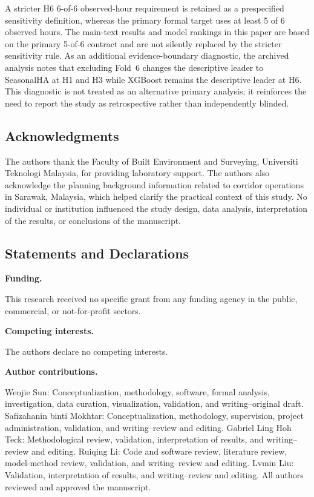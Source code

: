 \documentclass[pdflatex,sn-basic,Numbered]{sn-jnl}
\begin{document}
A stricter H6 6-of-6 observed-hour requirement is retained as a prespecified sensitivity definition, whereas the primary formal target uses at least 5 of 6 observed hours. The main-text results and model rankings in this paper are based on the primary 5-of-6 contract and are not silently replaced by the stricter sensitivity rule. As an additional evidence-boundary diagnostic, the archived analysis notes that excluding Fold~6 changes the descriptive leader to SeasonalHA at H1 and H3 while XGBoost remains the descriptive leader at H6. This diagnostic is not treated as an alternative primary analysis; it reinforces the need to report the study as retrospective rather than independently blinded.


\backmatter

\subsection*{Acknowledgments}

The authors thank the Faculty of Built Environment and Surveying, Universiti Teknologi Malaysia, for providing laboratory support. The authors also acknowledge the planning background information related to corridor operations in Sarawak, Malaysia, which helped clarify the practical context of this study. No individual or institution influenced the study design, data analysis, interpretation of the results, or conclusions of the manuscript.

\subsection*{Statements and Declarations}

\textbf{Funding.}

This research received no specific grant from any funding agency in the public, commercial, or not-for-profit sectors.

\textbf{Competing interests.}

The authors declare no competing interests.

\textbf{Author contributions.}

Wenjie Sun: Conceptualization, methodology, software, formal analysis, investigation, data curation, visualization, validation, and writing--original draft. Safizahanin binti Mokhtar: Conceptualization, methodology, supervision, project administration, validation, and writing--review and editing. Gabriel Ling Hoh Teck: Methodological review, validation, interpretation of results, and writing--review and editing. Ruiqing Li: Code and software review, literature review, model-method review, validation, and writing--review and editing. Lvmin Liu: Validation, interpretation of results, and writing--review and editing. All authors reviewed and approved the manuscript. 
\end{document}
